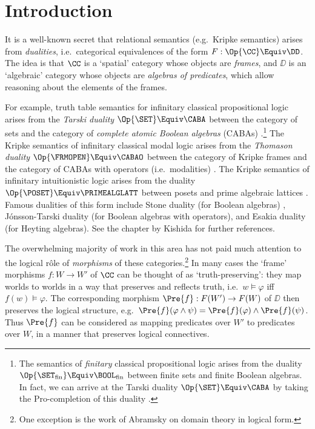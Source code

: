 \section{Introduction}\label{section:introduction}

It is a well-known secret that relational semantics (e.g.\ Kripke semantics)
arises from \emph{dualities}, i.e.\ categorical equivalences of the form $F :
\Op{\CC} \Equiv \DD$. The idea is that $\CC$ is a `spatial' category whose
objects are \emph{frames}, and $\DD$ is an `algebraic' category whose objects
are \emph{algebras of predicates}, which allow reasoning about the elements of
the frames.

For example, truth table semantics for infinitary classical propositional logic
arises from the \emph{Tarski duality} $\Op{\SET} \Equiv \CABA$ between the
category of sets and the category of \emph{complete atomic Boolean algebras}
(CABAs) \cite[\S 1]{kishida_2018}.\footnote{The semantics of \emph{finitary} classical
  propositional logic arises from the duality 
  \(\Op{\SET_{\text{fin}}} \Equiv \BOOL_{\text{fin}}\)
  between finite sets and finite Boolean algebras. In
  fact, we can arrive at the Tarski duality \(\Op{\SET} \Equiv \CABA\) by taking
the Pro-completion of this duality \cite{kurz_2012}.}
The Kripke semantics of infinitary classical modal logic
\cite{kripke_1963,kripke_1963b} arises from the \emph{Thomason duality}
$\Op{\FRMOPEN} \Equiv \CABAO$ between the category of Kripke frames and the category
of CABAs with operators (i.e.\ modalities) \cite{thomason_1975} \cite[\S
2.4]{kishida_2018}. The Kripke semantics of infinitary intuitionistic logic
\cite{kripke_1965b} arises from the duality $\Op{\POSET} \Equiv \PRIMEALGLATT$
between posets and prime algebraic lattices \cite{nielsen_1981,kavvos_2024a}.
Famous dualities of this form include Stone duality (for Boolean algebras)
\cite{johnstone_1982}, J\'{o}nsson-Tarski duality
\cite{jonsson_1951,hansoul_1983,sambin_1988} (for Boolean algebras with
operators), and Esakia duality \cite{esakia_2019} (for Heyting algebras). See
the chapter by Kishida \cite{kishida_2018} for further references.

The overwhelming majority of work in this area has not paid much attention to
the logical r\^{o}le of \emph{morphisms} of these categories.\footnote{One
exception is the work of Abramsky \cite{abramsky_1991} on domain theory in
logical form.} In many cases the `frame' morphisms $f : W \to W'$ of $\CC$ can
be thought of as `truth-preserving': they map worlds to worlds in a way that
preserves and reflects truth, i.e.\ $w \vDash \varphi$ iff $f(w) \vDash
\varphi$. The corresponding morphism $\Pre{f} : F(W') \to F(W)$ of $\DD$ then
preserves the logical structure, e.g.\ $\Pre{f}(\varphi \land \psi) =
\Pre{f}(\varphi) \land \Pre{f}(\psi)$. Thus $\Pre{f}$ can be considered as
mapping predicates over $W'$ to predicates over $W$, in a manner that
preserves logical connectives.

